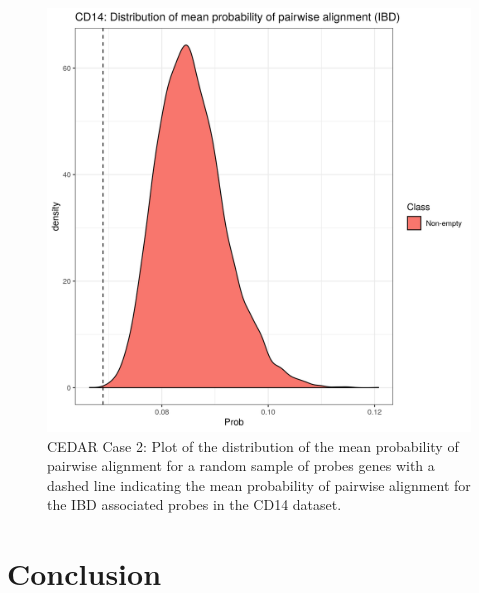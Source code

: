 \documentclass[12pt]{article} %
\begin{document}
	\begin{figure}[h]
		\centering
		\includegraphics[scale=0.75]{Images/Biology_data/Set_1000/All_datasets//Mean_alignment_probability/CD14_KEGG_INFLAMMATORY_BOWEL_DISEASE.png}
		\caption{CEDAR Case 2: Plot of the distribution of the mean probability of pairwise alignment for a random sample of probes genes with a dashed line indicating the mean probability of pairwise alignment for the IBD associated probes in the CD14 dataset.}
		\label{fig:results:cedar_2:mdi_cd14_ibd_alignment_prob_distn}
	\end{figure}
	
	\section{Conclusion}
	
\end{document}
